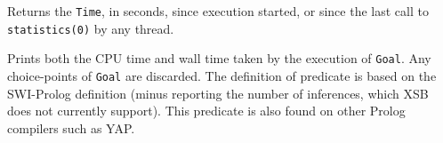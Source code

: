 \begin{description}
{
%
Returns the \texttt{Time}, in seconds, since execution started, or
since the last call to \texttt{statistics(0)} by any thread.
}

%
Prints both the CPU time and wall time taken by the execution of \texttt{Goal}.
Any choice-points of \texttt{Goal} are discarded. The definition of predicate is based 
on the SWI-Prolog definition (minus reporting the number of inferences, which XSB does 
not currently support). This predicate is also found on other Prolog compilers such as YAP.

\end{description}





